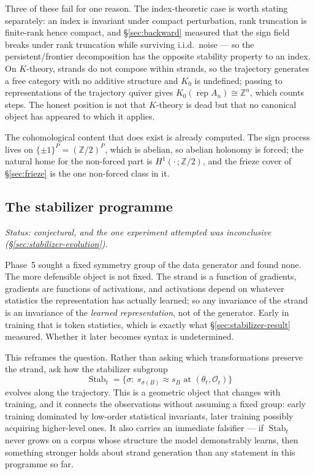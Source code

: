 Three of these fail for one reason. The index-theoretic case is worth stating
separately: an index is invariant under compact perturbation, rank truncation is
finite-rank hence compact, and \S\ref{sec:backward} measured that the sign field
breaks under rank truncation while surviving i.i.d.\ noise --- so the
persistent/frontier decomposition has the opposite stability property to an
index. On $K$-theory, strands do not compose within strands, so the trajectory
generates a free category with no additive structure and $K_0$ is undefined;
passing to representations of the trajectory quiver gives
$K_0(\operatorname{rep}A_n)\cong\mathbb{Z}^n$, which counts steps. The honest
position is not that $K$-theory is dead but that no canonical object has
appeared to which it applies.

The cohomological content that does exist is already computed. The sign process
lives on $\{\pm1\}^P=(\mathbb{Z}/2)^P$, which is abelian, so abelian holonomy
is forced; the natural home for the non-forced part is
$H^1(\cdot\,;\mathbb{Z}/2)$, and the frieze cover of \S\ref{sec:frieze} is the
one non-forced class in it.

\subsection{The stabilizer programme}
\label{sec:stabilizer-programme}

\emph{Status: conjectural, and the one experiment attempted was inconclusive
(\S\ref{sec:stabilizer-evolution}).}

Phase~5 sought a fixed symmetry group of the data generator and found none.
The more defensible object is not fixed. The strand is a function of gradients,
gradients are functions of activations, and activations depend on whatever
statistics the representation has actually learned; so any invariance of the
strand is an invariance of the \emph{learned representation}, not of the
generator. Early in training that is token statistics, which is exactly what
\S\ref{sec:stabilizer-result} measured. Whether it later becomes syntax is
undetermined.

This reframes the question. Rather than asking which transformations preserve
the strand, ask how the stabilizer subgroup
\[
\operatorname{Stab}_t=\{\sigma:\ s_{\sigma(B)}\approx s_B \text{ at }
(\theta_t,\mathcal{O}_t)\}
\]
evolves along the trajectory. This is a geometric object that changes with
training, and it connects the observations without assuming a fixed group: early
training dominated by low-order statistical invariants, later training possibly
acquiring higher-level ones. It also carries an immediate falsifier --- if
$\operatorname{Stab}_t$ never grows on a corpus whose structure the model
demonstrably learns, then something stronger holds about strand generation than
any statement in this programme so far.

